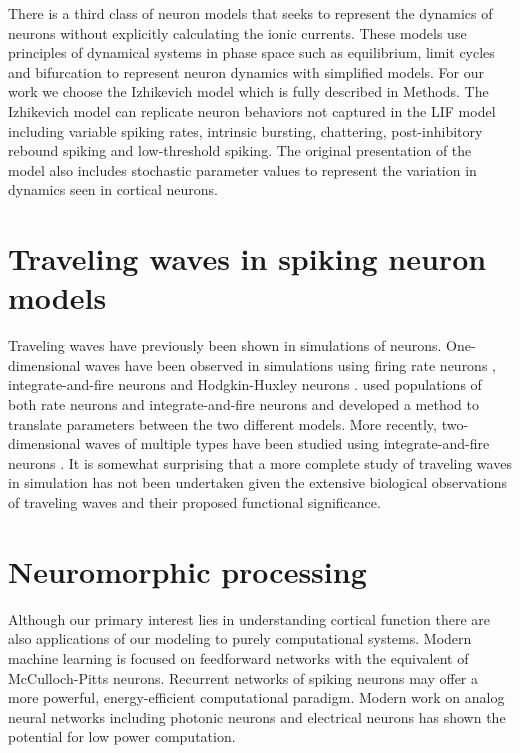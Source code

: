 There is a third class of neuron models that seeks to represent the dynamics of neurons without explicitly calculating the ionic currents.
These models use principles of dynamical systems in phase space such as equilibrium, limit cycles and bifurcation to represent neuron dynamics with simplified models.
For our work we choose the Izhikevich model\citep{izhikevich2003} which is fully described in Methods.
The Izhikevich model can replicate neuron behaviors not captured in the LIF model including variable spiking rates, intrinsic bursting, chattering, post-inhibitory rebound spiking and low-threshold spiking.
The original presentation of the model also includes stochastic parameter values to represent the variation in dynamics seen in cortical neurons.

\section{Traveling waves in spiking neuron models}
Traveling waves have previously been shown in simulations of neurons.
One-dimensional waves have been observed in simulations using firing rate neurons \citep{Roxin2005}, integrate-and-fire neurons \citep{Bressloff1997}\citep{Golomb1999} and Hodgkin-Huxley neurons \citep{Golomb1997}.
\citet{Senk2020} used populations of both rate neurons and integrate-and-fire neurons and developed a method to translate parameters between the two different models.
More recently, two-dimensional waves of multiple types have been studied using integrate-and-fire neurons \citep{Mehring2003}\citep{keane2015}\citep{Keane2018}\citep{Spreizer2019}\citep{Chen2019}.
It is somewhat surprising that a  more complete study of traveling waves in simulation has not been undertaken given the extensive biological observations of traveling waves
and their proposed functional significance.

\section{Neuromorphic processing}
Although our primary interest lies in understanding cortical function there are also applications of our modeling to purely computational systems.
Modern machine learning is focused on feedforward networks with the equivalent of McCulloch-Pitts neurons.
Recurrent networks of spiking neurons may offer a more powerful, energy-efficient computational paradigm.
Modern work on analog neural networks including photonic neurons\citep{Xiang2016}\citep{Coarer2018}\citep{Fok2010} and electrical neurons has shown the potential for low power computation.


